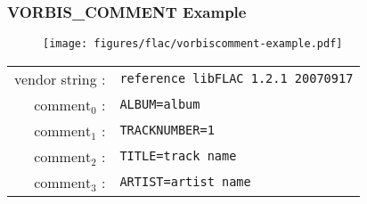 \clearpage

\subsubsection{VORBIS\_COMMENT Example}
\begin{figure}[h]
  \texttt{[image: figures/flac/vorbiscomment-example.pdf]}
\end{figure}
\begin{table}[h]
\begin{tabular}{rl}
  vendor string : & \texttt{reference libFLAC 1.2.1 20070917} \\
  $\text{comment}_0$ : & \texttt{ALBUM=album} \\
  $\text{comment}_1$ : & \texttt{TRACKNUMBER=1} \\
  $\text{comment}_2$ : & \texttt{TITLE=track name} \\
  $\text{comment}_3$ : & \texttt{ARTIST=artist name} \\
\end{tabular}
\end{table}

\clearpage




